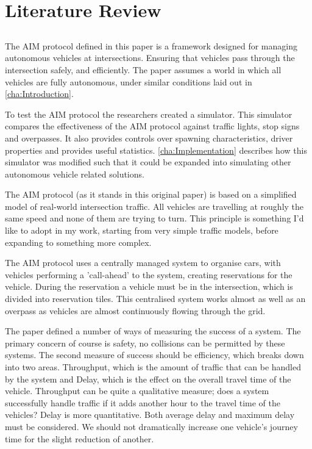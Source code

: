 \chapter{Literature Review}
\label{cha:Literature Review}
\section{}
\label{sec:Dresner2004}
The AIM protocol defined in this paper is a framework designed for managing autonomous vehicles at intersections. Ensuring that vehicles pass through the intersection safely, and efficiently. The paper assumes a world in which all vehicles are fully autonomous, under similar conditions laid out in \autoref{cha:Introduction}.

To test the AIM protocol the researchers created a simulator. This simulator compares the effectiveness of the AIM protocol against traffic lights, stop signs and overpasses. It also provide{}s controls over spawning characteristics, driver properties and provides useful statistics. \autoref{cha:Implementation} describes how this simulator was modified such that it could be expanded into simulating other autonomous vehicle related solutions.

The AIM protocol (as it stands in this original paper) is based on a simplified model of real-world intersection traffic. All vehicles are travelling at roughly the same speed and none of them are trying to turn. This principle is something I'd like to adopt in my work, starting from very simple traffic models, before expanding to something more complex.

The AIM protocol uses a centrally managed system to organise cars, with vehicles performing a 'call-ahead' to the system, creating reservations for the vehicle. During the reservation a vehicle must be in the intersection, which is divided into reservation tiles. This centralised system works almost as well as an overpass as vehicles are almost continuously flowing through the grid. 

The paper defined a number of ways of measuring the success of a system. The primary concern of course is safety, no collisions can be permitted by these systems. The second measure of success should be efficiency, which breaks down into two areas. Throughput, which is the amount of traffic that can be handled by the system and Delay, which is the effect on the overall travel time of the vehicle. Throughput can be quite a qualitative measure; does a system successfully handle traffic if it adds another hour to the travel time of the vehicles? Delay is more quantitative. Both average delay and maximum delay must be considered. We should not dramatically increase one vehicle's journey time for the slight reduction of another.

